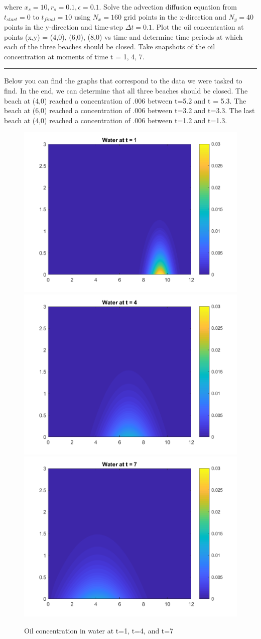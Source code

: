 \documentclass[12pt]{article}
\begin{document}
\noindent where $x_{s} = 10, r_{s} = 0.1, \epsilon = 0.1$. Solve the advection diffusion equation from $t_{start} = 0$ to $t_{final} = 10$ using $N_x = 160$ grid points in the x-direction and $N_y = 40$ points in the y-direction and time-step $\Delta t = 0.1$. Plot the oil concentration at points (x,y) = (4,0), (6,0), (8,0) vs time and determine time periods at which each of the three beaches should be closed. Take snapshots of the oil concentration at moments of time t = 1, 4, 7.
\begin{center}
\rule{10cm}{0.4pt}
\end{center}
Below you can find the graphs that correspond to the data we were tasked to find. In the end, we can determine that all three beaches should be closed. The beach at (4,0) reached a concentration of .006 between t=5.2 and t = 5.3. The beach at (6,0) reached a concentration of .006 between t=3.2 and t=3.3. The last beach at (4,0) reached a concentration of .006 between t=1.2 and t=1.3.
\begin{figure}[htb]
\begin{adjustwidth}{-2cm}{-2cm}
\centering
\includegraphics[width=.41\textwidth]{Problem2_fig1.png}\hfill
\includegraphics[width=.41\textwidth]{Problem2_fig2.png}\hfill
\includegraphics[width=.41\textwidth]{Problem2_fig3.png}
\caption*{Oil concentration in water at t=1, t=4, and t=7}
\label{fig:p2_fig1-3}
\end{adjustwidth}
\end{figure}
\end{document}
